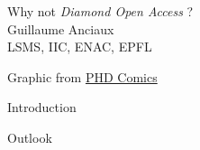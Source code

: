 \documentclass[10pt,compress,serif,aspectratio=169]{beamer}
\begin{document}
\begin{frame}[t]
  \begin{center}
  \vspace{1cm}
  {\huge Why not \textit{Diamond Open Access} ?}\\
  \vspace{.5cm}
  {\Large Guillaume Anciaux}\\{LSMS, IIC, ENAC, EPFL}\\
  \end{center}
  \vspace{1cm}
  \begin{center}
    \small
    Graphic from \href{http://www.phdcomics.com/comics.php?f=1533}{PHD Comics}
  \end{center}
\end{frame}




\begin{frame}[t]{Introduction}

\end{frame}

\begin{frame}[t]{Outlook}
\begin{columns}[t]
        \begin{column}{.5\textwidth}
            \tableofcontents[sections={1-3}]
        \end{column}
        \begin{column}{.5\textwidth}
            \tableofcontents[sections={4-6}]
        \end{column}
    \end{columns}
\end{frame}
\end{document}
